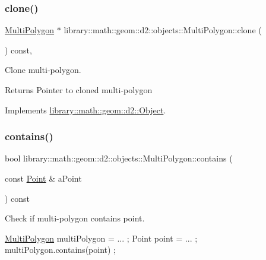 \subsubsection{\texorpdfstring{clone()}{clone()}}
{\footnotesize\ttfamily \hyperlink{classlibrary_1_1math_1_1geom_1_1d2_1_1objects_1_1_multi_polygon}{Multi\+Polygon} $\ast$ library\+::math\+::geom\+::d2\+::objects\+::\+Multi\+Polygon\+::clone (\begin{DoxyParamCaption}{ }\end{DoxyParamCaption}) const\hspace{0.3cm}{\ttfamily [override]}, {\ttfamily [virtual]}}



Clone multi-\/polygon. 

\begin{DoxyReturn}{Returns}
Pointer to cloned multi-\/polygon 
\end{DoxyReturn}


Implements \hyperlink{classlibrary_1_1math_1_1geom_1_1d2_1_1_object_a5c26ae4120edb24f6463d65a9cef247d}{library\+::math\+::geom\+::d2\+::\+Object}.

\mbox{\label{classlibrary_1_1math_1_1geom_1_1d2_1_1objects_1_1_multi_polygon_a9b11d0b3d9a341f541cebcd032227986}} 
\subsubsection{\texorpdfstring{contains()}{contains()}\hspace{0.1cm}{\footnotesize\ttfamily [1/2]}}
{\footnotesize\ttfamily bool library\+::math\+::geom\+::d2\+::objects\+::\+Multi\+Polygon\+::contains (\begin{DoxyParamCaption}\item[{const \hyperlink{classlibrary_1_1math_1_1geom_1_1d2_1_1objects_1_1_point}{Point} \&}]{a\+Point }\end{DoxyParamCaption}) const}



Check if multi-\/polygon contains point. 


\begin{DoxyCode}
\hyperlink{classlibrary_1_1math_1_1geom_1_1d2_1_1objects_1_1_multi_polygon_a10c2390027c64a8541efde7fcb2b282f}{MultiPolygon} multiPolygon = ... ;
Point point = ... ;
multiPolygon.contains(point) ;
\end{DoxyCode}



